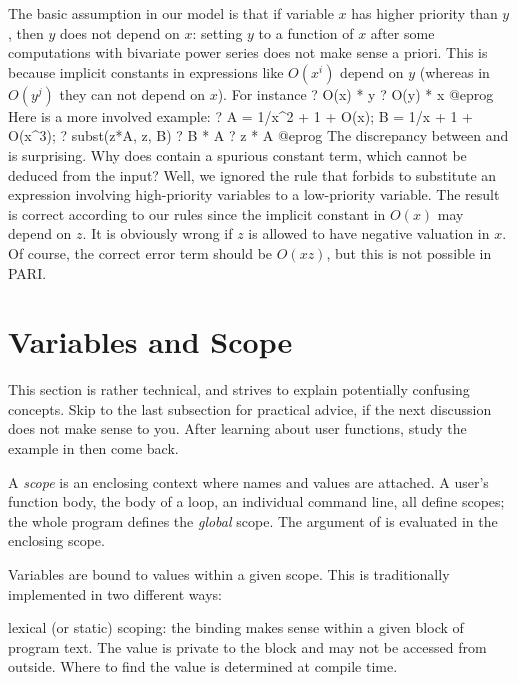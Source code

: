 The basic assumption in our model is that if variable $x$ has higher
priority than $y$, then $y$ does not depend on $x$: setting $y$ to a
function of $x$ after some computations with bivariate power series does
not make sense a priori. This is because implicit constants in
expressions like $O(x^i)$ depend on $y$ (whereas in $O(y^j)$ they can not
depend on $x$). For instance
\bprog
  ? O(x) * y
  ? O(y) * x
@eprog\noindent
Here is a more involved example:
\bprog
  ? A = 1/x^2 + 1 + O(x); B = 1/x + 1 + O(x^3);
  ? subst(z*A, z, B)
  ? B * A
  ? z * A
@eprog\noindent
The discrepancy between  and  is surprising. Why does
 contain a spurious constant term, which cannot be
deduced from the input? Well, we ignored the rule that forbids to
substitute an expression involving high-priority variables
to a low-priority variable. The result  is correct according to
our rules since the implicit constant in $O(x)$ may depend on $z$. It is
obviously wrong if $z$ is allowed to have negative valuation in $x$. Of
course, the correct error term should be $O(xz)$, but this is not
possible in PARI.

\section{Variables and Scope}\label{se:scope}
This section is rather technical, and strives to explain potentially
confusing concepts. Skip to the last subsection for practical advice, if the
next discussion does not make sense to you. After learning about user
functions, study the example in  then come back.


A \emph{scope} is an enclosing context where names and values are attached.
A user's function body, the body of a loop, an individual command line, all
define scopes; the whole program defines the \emph{global} scope. The
argument of  is evaluated in the enclosing scope.

Variables are bound to values within a given scope. This is traditionally
implemented in two different ways:

\item{} lexical (or static) scoping: the binding makes
sense within a given block of program text. The value is private to the block
and may not be accessed from outside. Where to find the value is determined
at compile time.

